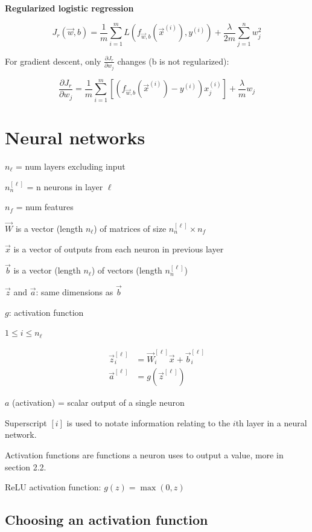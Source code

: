 \documentclass[12pt]{article}
\begin{document}
\noindent \textbf{Regularized logistic regression}

\[ J_r(\vec{w},b) = \frac{1}{m} \sum_{i=1}^m L(f_{\vec{w},b}(\vec{x}^{(i)}), y^{(i)}) + \frac{\lambda}{2m} \sum_{j=1}^n w_j^2 \]

For gradient descent, only $\frac{\partial J_r}{\partial w_j}$ changes (b is not regularized):

\[ \frac{\partial J_r}{\partial w_j} = \frac{1}{m} \sum_{i=1}^m \left[(f_{\vec{w},b}(\vec{x}^{(i)}) - y^{(i)})x_j^{(i)}\right] + \frac{\lambda}{m} w_j \]

\pagebreak

\section{Neural networks}

$n_{\ell}$ = num layers excluding input

$n^{[\ell]}_n$ = n neurons in layer $\ell$

$n_f$ = num features

$\vec{W}$ is a vector (length $n_{\ell}$) of matrices of size $n^{[\ell]}_n \times n_f$

$\vec{x}$ is a vector of outputs from each neuron in previous layer

$\vec{b}$ is a vector (length $n_{\ell}$) of vectors (length $n^{[\ell]}_n$)

$\vec{z}$ and $\vec{a}$: same dimensions as $\vec{b}$

$g$: activation function

$1 \leq i \leq n_{\ell}$

\begin{align*}
\vec{z}^{[\ell]}_i &= \vec{W}^{[\ell]}_i \vec{x} + \vec{b}^{[\ell]}_i\\
\vec{a}^{[\ell]} &= g(\vec{z}^{[\ell]})
\end{align*}

$a$ (activation) = scalar output of a single neuron

Superscript $[i]$ is used to notate information relating to the $i$th layer in a neural network.

Activation functions are functions a neuron uses to output a value, more in section 2.2.

ReLU activation function: $g(z) = \max(0, z)$

\subsection{Choosing an activation function}
\end{document}
